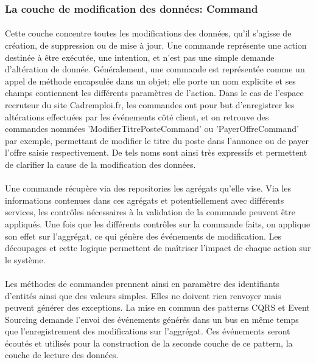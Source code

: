\subsubsection{La couche de modification des données: Command}
\label{subs:La couche de modification des données: Command}
\paragraph{}
Cette couche concentre toutes les modifications des données, qu'il s'agisse de création, de suppression ou de mise à jour.
Une commande représente une action destinée à être exécutée, une intention, et n'est pas une simple demande d'altération de donnée.
Généralement, une commande est représentée comme un appel de méthode encapsulée dans un objet; elle porte un nom explicite et ses champs contiennent les différents paramètres de l'action.
Dans le cas de l'espace recruteur du site Cadremploi.fr, les commandes ont pour but d'enregistrer les altérations effectuées par les événements côté client, et on retrouve des commandes nommées 'ModifierTitrePosteCommand' ou 'PayerOffreCommand' par exemple, permettant de modifier le titre du poste dans l'annonce ou de payer l'offre saisie respectivement.
De tels noms sont ainsi très expressifs et permettent de clarifier la cause de la modification des données.
\paragraph{}
Une commande récupère via des repositories les agrégats qu'elle vise.
Via les informations contenues dans ces agrégats et potentiellement avec différents services, les contrôles nécessaires à la validation de la commande peuvent être appliqués.
Une fois que les différents contrôles sur la commande faits, on applique son effet sur l'aggrégat, ce qui génère des événements de modification.
Les découpages et cette logique permettent de maîtriser l'impact de chaque action sur le système.
\paragraph{}
Les méthodes de commandes prennent ainsi en paramètre des identifiants d'entités ainsi que des valeurs simples.
Elles ne doivent rien renvoyer mais peuvent générer des exceptions.
La mise en commun des patterns CQRS et Event Sourcing demande l'envoi des événements générés dans un bus en même temps que l'enregistrement des modifications sur l'aggrégat.
Ces événements seront écoutés et utilisés pour la construction de la seconde couche de ce pattern, la couche de lecture des données.

